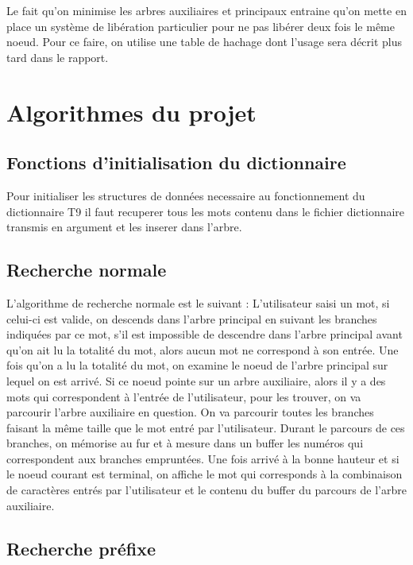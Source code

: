 \documentclass[15pt, a4paper]{article}
\begin{document}
Le fait qu'on minimise les arbres auxiliaires et principaux entraine qu'on mette en place
un système de libération particulier pour ne pas libérer deux fois le même noeud. Pour ce
faire, on utilise une table de hachage dont l'usage sera décrit plus tard dans le 
rapport.

\section{Algorithmes du projet}

\subsection{Fonctions d'initialisation du dictionnaire}

Pour initialiser les structures de données necessaire au fonctionnement du dictionnaire T9
il faut recuperer tous les mots contenu dans le fichier dictionnaire transmis en argument
et les inserer dans l'arbre.

\subsection{Recherche normale}

L'algorithme de recherche normale est le suivant : L'utilisateur saisi un mot,
si celui-ci est valide, on descends dans l'arbre principal en suivant les 
branches indiquées par ce mot, s'il est impossible de descendre 
dans l'arbre principal avant qu'on ait lu la totalité du mot, alors aucun mot ne
correspond à son entrée. Une fois qu'on a lu la totalité du mot, on examine le
noeud de l'arbre principal sur lequel on est arrivé. Si ce noeud pointe sur 
un arbre auxiliaire, alors il y
a des mots qui correspondent à l'entrée de l'utilisateur, pour les trouver,
on va parcourir l'arbre auxiliaire en question. On va parcourir toutes les 
branches faisant la même taille que le mot entré par l'utilisateur. Durant le 
parcours de ces branches, on mémorise au fur et à mesure dans un buffer les 
numéros qui correspondent aux branches empruntées. 
Une fois arrivé à la bonne hauteur et si le noeud courant est 
terminal, on affiche le mot qui corresponds à la combinaison de caractères entrés
par l'utilisateur et le contenu du buffer du parcours de l'arbre auxiliaire.

\subsection{Recherche préfixe}
\end{document}
